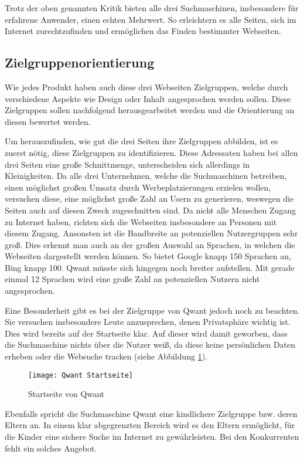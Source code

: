 Trotz der oben genannten Kritik bieten alle drei Suchmaschinen, insbesondere für erfahrene Anwender, einen echten Mehrwert.
So erleichtern es alle Seiten, sich im Internet zurechtzufinden und ermöglichen das Finden bestimmter Webseiten.

\subsection{Zielgruppenorientierung}
Wie jedes Produkt haben auch diese drei Webseiten Zielgruppen, welche durch verschiedene Aspekte wie Design oder Inhalt
angesprochen werden sollen. Diese Zielgruppen sollen nachfolgend herausgearbeitet werden und die Orientierung an diesen
bewertet werden.

Um herauszufinden, wie gut die drei Seiten ihre Zielgruppen abbilden, ist es zuerst nötig, diese Zielgruppen zu
identifizieren. Diese Adressaten haben bei allen drei Seiten eine große Schnittmenge, unterscheiden sich allerdings in
Kleinigkeiten. Da alle drei Unternehmen, welche die Suchmaschinen betreiben, einen möglichst großen Umsatz durch Werbeplatzierungen
erzielen wollen, versuchen diese, eine möglichst große Zahl an Usern zu generieren, weswegen die Seiten auch auf diesen Zweck
zugeschnitten sind.  Da nicht alle Menschen Zugang zu Internet haben, richten sich die Webseiten insbesondere an Personen
mit diesem Zugang. Ansonsten ist die Bandbreite an potenziellen Nutzergruppen sehr groß. Dies erkennt man auch an der großen
Auswahl an Sprachen, in welchen die Webseiten dargestellt werden können. So bietet Google knapp 150 Sprachen an, Bing
knapp 100. Qwant müsste sich hingegen noch breiter aufstellen. Mit gerade einmal 12 Sprachen wird eine große Zahl an
potenziellen Nutzern nicht angesprochen.

Eine Besonderheit gibt es bei der Zielgruppe von Qwant jedoch noch zu beachten. Sie versuchen insbesondere Leute anzusprechen,
denen Privatsphäre wichtig ist. Dies wird bereits auf der Startseite klar. Auf dieser wird damit geworben, dass die Suchmaschine
nichts über die Nutzer weiß, da diese keine persönlichen Daten erheben oder die Websuche tracken (siehe Abbildung \ref{fig:qwantstartseite}).
\begin{figure}[h]
    \centering
    \texttt{[image: Qwant Startseite]}
    \caption{Startseite von Qwant}
    \label{fig:qwantstartseite}
\end{figure}

Ebenfalls spricht die Suchmaschine Qwant eine kindlichere Zielgruppe bzw. deren Eltern an. In einem klar abgegrenzten
Bereich wird es den Eltern ermöglicht, für die Kinder eine sichere Suche im Internet zu gewährleisten. Bei den Konkurrenten
fehlt ein solches Angebot.

